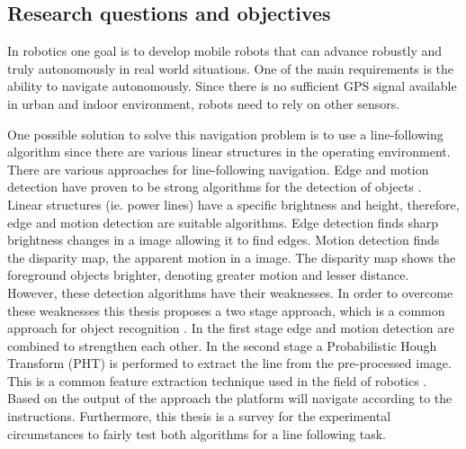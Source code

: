 \documentclass[a4paper]{article}
\begin{document}
\subsection{Research questions and objectives}
\label{researchquestion}
In robotics one goal is to develop mobile robots that can advance robustly and truly autonomously in real world situations. One of the main requirements is the ability to navigate autonomously. Since there is no sufficient GPS signal available in urban and indoor environment, robots need to rely on other sensors.

One possible solution to solve this navigation problem is to use a line-following algorithm since there are various linear structures in the operating environment. There are various approaches for line-following navigation. Edge and motion detection have proven to be strong algorithms for the detection of objects \cite{Bills2011, Gerke2011}. Linear structures (ie. power lines) have a specific brightness and height, therefore, edge and motion detection are suitable algorithms. Edge detection finds sharp brightness changes in a image allowing it to find edges. Motion detection finds the disparity map, the apparent motion in a image. The disparity map shows the foreground objects brighter, denoting greater motion and lesser distance. However, these detection algorithms have their weaknesses. In order to overcome these weaknesses this thesis proposes a two stage approach, which is a common approach for object recognition \cite{Frew2004, Katrasnik2010, Gerke2011}. In the first stage edge and motion detection are combined to strengthen each other. In the second stage a Probabilistic Hough Transform (PHT) is performed to extract the line from the pre-processed image. This is a common feature extraction technique used in the field of robotics \cite{Frew2004, Zhengrong2008, Bills2011}. Based on the output of the approach the platform will navigate according to the instructions. Furthermore, this thesis is a survey for the experimental circumstances to fairly test both algorithms for a line following task.
\end{document}
